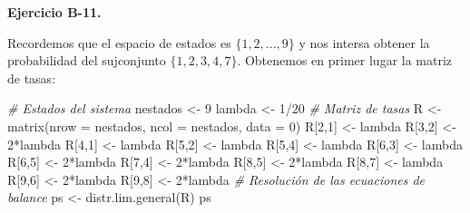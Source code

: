 \documentclass[
]{book}
\newenvironment{Shaded}{\begin{snugshade}}{\end{snugshade}}
\newcommand{\AttributeTok}[1]{\textcolor[rgb]{0.77,0.63,0.00}{#1}}
\newcommand{\CommentTok}[1]{\textcolor[rgb]{0.56,0.35,0.01}{\textit{#1}}}
\newcommand{\DecValTok}[1]{\textcolor[rgb]{0.00,0.00,0.81}{#1}}
\newcommand{\FunctionTok}[1]{\textcolor[rgb]{0.00,0.00,0.00}{#1}}
\newcommand{\NormalTok}[1]{#1}
\newcommand{\OtherTok}[1]{\textcolor[rgb]{0.56,0.35,0.01}{#1}}
\newcommand{\SpecialCharTok}[1]{\textcolor[rgb]{0.00,0.00,0.00}{#1}}
\theoremstyle{definition}
\theoremstyle{definition}
\theoremstyle{definition}
\theoremstyle{definition}
\theoremstyle{remark}
\begin{document}
\textbf{Ejercicio B-11.}

Recordemos que el espacio de estados es \(\{1, 2,...,9\}\) y nos intersa obtener la probabilidad del sujconjunto \(\{1, 2, 3, 4, 7\}\). Obtenemos en primer lugar la matriz de tasas:

\begin{Shaded}
\begin{Highlighting}[]
\CommentTok{\# Estados del sistema}
\NormalTok{nestados }\OtherTok{\textless{}{-}} \DecValTok{9}
\NormalTok{lambda }\OtherTok{\textless{}{-}} \DecValTok{1}\SpecialCharTok{/}\DecValTok{20}
\CommentTok{\# Matriz de tasas}
\NormalTok{R }\OtherTok{\textless{}{-}} \FunctionTok{matrix}\NormalTok{(}\AttributeTok{nrow =}\NormalTok{ nestados, }\AttributeTok{ncol =}\NormalTok{ nestados, }\AttributeTok{data =} \DecValTok{0}\NormalTok{)}
\NormalTok{R[}\DecValTok{2}\NormalTok{,}\DecValTok{1}\NormalTok{] }\OtherTok{\textless{}{-}}\NormalTok{ lambda }
\NormalTok{R[}\DecValTok{3}\NormalTok{,}\DecValTok{2}\NormalTok{] }\OtherTok{\textless{}{-}} \DecValTok{2}\SpecialCharTok{*}\NormalTok{lambda }
\NormalTok{R[}\DecValTok{4}\NormalTok{,}\DecValTok{1}\NormalTok{] }\OtherTok{\textless{}{-}}\NormalTok{ lambda }
\NormalTok{R[}\DecValTok{5}\NormalTok{,}\DecValTok{2}\NormalTok{] }\OtherTok{\textless{}{-}}\NormalTok{ lambda }
\NormalTok{R[}\DecValTok{5}\NormalTok{,}\DecValTok{4}\NormalTok{] }\OtherTok{\textless{}{-}}\NormalTok{ lambda }
\NormalTok{R[}\DecValTok{6}\NormalTok{,}\DecValTok{3}\NormalTok{] }\OtherTok{\textless{}{-}}\NormalTok{ lambda }
\NormalTok{R[}\DecValTok{6}\NormalTok{,}\DecValTok{5}\NormalTok{] }\OtherTok{\textless{}{-}} \DecValTok{2}\SpecialCharTok{*}\NormalTok{lambda}
\NormalTok{R[}\DecValTok{7}\NormalTok{,}\DecValTok{4}\NormalTok{] }\OtherTok{\textless{}{-}} \DecValTok{2}\SpecialCharTok{*}\NormalTok{lambda}
\NormalTok{R[}\DecValTok{8}\NormalTok{,}\DecValTok{5}\NormalTok{] }\OtherTok{\textless{}{-}} \DecValTok{2}\SpecialCharTok{*}\NormalTok{lambda}
\NormalTok{R[}\DecValTok{8}\NormalTok{,}\DecValTok{7}\NormalTok{] }\OtherTok{\textless{}{-}}\NormalTok{ lambda}
\NormalTok{R[}\DecValTok{9}\NormalTok{,}\DecValTok{6}\NormalTok{] }\OtherTok{\textless{}{-}} \DecValTok{2}\SpecialCharTok{*}\NormalTok{lambda}
\NormalTok{R[}\DecValTok{9}\NormalTok{,}\DecValTok{8}\NormalTok{] }\OtherTok{\textless{}{-}} \DecValTok{2}\SpecialCharTok{*}\NormalTok{lambda}
\CommentTok{\# Resolución  de las ecuaciones de balance}
\NormalTok{ps }\OtherTok{\textless{}{-}} \FunctionTok{distr.lim.general}\NormalTok{(R)}
\NormalTok{ps}
\end{Highlighting}
\end{Shaded}
\end{document}
